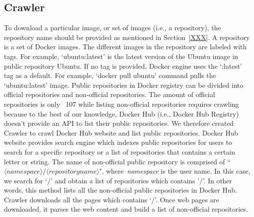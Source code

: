 \subsection{Crawler}
%
To download a particular image, or set of images (i.e., a repository), the repository name should be provided as mentioned in Section~\ref{XXX}. 
%
A repository is a set of Docker images. The different images in the repository are labeled with tags.
%
For example, `ubuntu:latest' is the latest version of the Ubuntu image in public repository Ubuntu.
%
If no tag is provided, Docker engine uses the `:latest' tag as a default. For example, `docker pull ubuntu' command pulls the `ubuntu:latest' image.
%
%
Public repositories in Docker registry can be divided into official repositories and non-official repositories.
%
%
The amount of official repositories is only ~107 while listing non-official repositories requires crawling because to the best of our knowledge, Docker Hub (i.e., Docker Hub Registry) doesn't provide an API to list their public repositories.
%
We therefore created Crawler to crawl Docker Hub website and list public repositories.
%
Docker Hub website provides search engine which indexes public repositories for users to search for a specific repository or a list of repositories that contains a certain letter or string. 
%
The name of non-official public repository is comprised of ``$\langle namespace\rangle/\langle repository name \rangle $", where~\textit{namespace} is the user name. 
%
In this case, we search for `/' and obtain a list of repositories which contains '/'.
%
In other words, this method lists all the non-official public repositories in Docker Hub.
%
Crawler downloads all the pages which contains `/'.
%
Once web pages are downloaded, it parses the web content and build a list of non-official repositories. 



